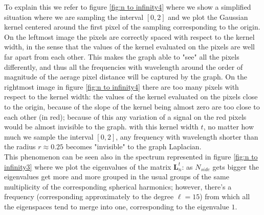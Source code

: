  To explain this we refer to figure \ref{fig:n to infinity4} where we show a simplified situation where we are sampling the interval $[0, 2]$ and we plot the Gaussian kernel centered around the first pixel of the sampling corresponding to the origin. On the leftmost image the pixels are correctly spaced with respect to the kernel width, in the sense that the values of the kernel evaluated on the pixels are well far apart from each other. This makes the graph able to "see" all the pixels differently, and thus all the frequencies with wavelength around the order of magnitude of the aerage pixel distance will be captured by the graph. On the rightmost image in figure \ref{fig:n to infinity4} there are too many pixels with respect to the kernel width: the values of the kernel evaluated on the pixels close to the origin, because of the slope of the kernel being almost zero are too close to each other (in red); because of this any variation of a signal on the red pixels would be almost invisible to the graph. with this kernel width $t$, no matter how much we sample the interval $[0,2]$, any frequency with wavelength shorter than the radius $r\approx0.25$ becomes "invisible" to the graph Laplacian.\\
 This phenomenon can be seen also in the spectrum represented in figure \ref{fig:n to infinity3} where we plot the eigenvalues of the matrix $\mathbf L_n^t$: as $N_{side}$ gets bigger the eigenvalues get more and more grouped in the usual groups of the same multiplicity of the corresponding spherical harmonics; however, there's a frequency (corresponding approximately to the degree $\ell=15$) from which all the eigenspaces tend to merge into one, corresponding to the eigenvalue $1$.
 
